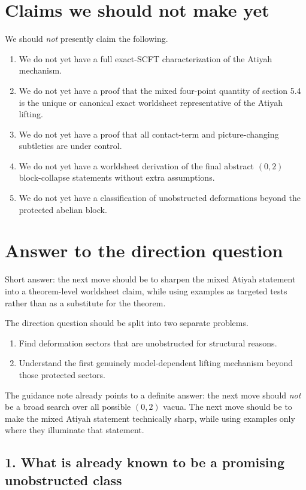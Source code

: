 \documentclass[11pt]{article}
\begin{document}
\section{Claims we should not make yet}

We should \emph{not} presently claim the following.
\begin{enumerate}
\item We do not yet have a full exact-SCFT characterization of the Atiyah mechanism.
\item We do not yet have a proof that the mixed four-point quantity of section 5.4 is the unique or canonical exact worldsheet representative of the Atiyah lifting.
\item We do not yet have a proof that all contact-term and picture-changing subtleties are under control.
\item We do not yet have a worldsheet derivation of the final abstract $(0,2)$ block-collapse statements without extra assumptions.
\item We do not yet have a classification of unobstructed deformations beyond the protected abelian block.
\end{enumerate}

\section{Answer to the direction question}

Short answer: the next move should be to sharpen the mixed Atiyah statement into a theorem-level worldsheet claim, while using examples as targeted tests rather than as a substitute for the theorem.

The direction question should be split into two separate problems.
\begin{enumerate}
\item Find deformation sectors that are unobstructed for structural reasons.
\item Understand the first genuinely model-dependent lifting mechanism beyond those protected sectors.
\end{enumerate}

The guidance note already points to a definite answer: the next move should \emph{not} be a broad search over all possible $(0,2)$ vacua. The next move should be to make the mixed Atiyah statement technically sharp, while using examples only where they illuminate that statement.

\subsection*{1. What is already known to be a promising unobstructed class}
\end{document}
